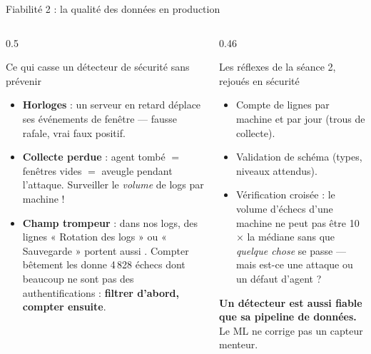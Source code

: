 \begin{frame}{Fiabilité 2 : la qualité des données en production}
\begin{columns}[t]
\begin{column}{0.5\textwidth}
\begin{block}{Ce qui casse un détecteur de sécurité sans prévenir}
\begin{itemize}
\item \textbf{Horloges} : un serveur en retard déplace ses événements de
fenêtre --- fausse rafale, vrai faux positif.
\item \textbf{Collecte perdue} : agent tombé $=$ fenêtres vides $=$
aveugle pendant l'attaque. Surveiller le \emph{volume} de logs par machine !
\item \textbf{Champ trompeur} : dans nos logs, des lignes « Rotation des
logs » ou « Sauvegarde » portent aussi .
Compter bêtement les  donne 4\,828 échecs dont beaucoup ne sont
pas des authentifications : \textbf{filtrer d'abord, compter ensuite}.
\end{itemize}
\end{block}
\end{column}
\begin{column}{0.46\textwidth}
\begin{block}{Les réflexes de la séance 2, rejoués en sécurité}
\begin{itemize}
\item Compte de lignes par machine et par jour (trous de collecte).
\item Validation de schéma (types, niveaux attendus).
\item Vérification croisée : le volume d'échecs d'une machine ne peut pas
être 10$\times$ la médiane sans que \emph{quelque chose} se passe ---
mais est-ce une attaque ou un défaut d'agent ?
\end{itemize}
\end{block}
\begin{kbox}[Règle]
\textbf{Un détecteur est aussi fiable que sa pipeline de données.}
Le ML ne corrige pas un capteur menteur.
\end{kbox}
\end{column}
\end{columns}
\end{frame}

